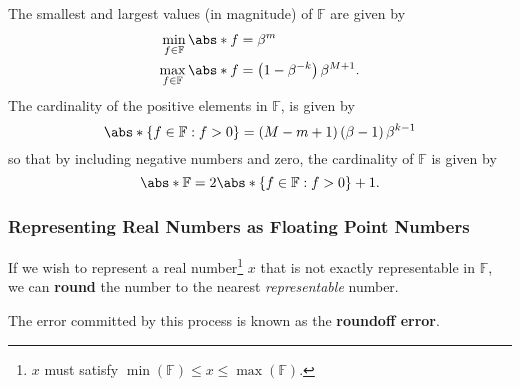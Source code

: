 \documentclass{article}
\begin{document}
\begin{corollary}
    The smallest and largest values (in magnitude) of \(\mathbb{F}\) are given by
    \begin{align*}
        \min_{f \in \mathbb{F}} \abs*{f} & = \beta^m                                      \\
        \max_{f \in \mathbb{F}} \abs*{f} & = \left( 1 - \beta^{-k} \right) \beta^{M + 1}.
    \end{align*}
    The cardinality of the positive elements in \(\mathbb{F}\),
    is given by
    \begin{equation*}
        \abs*{\left\{ f \in \mathbb{F} : f > 0 \right\}} = \left( M - m + 1 \right) \left( \beta - 1 \right) \beta^{k - 1}
    \end{equation*}
    so that by including negative numbers and zero, the cardinality of \(\mathbb{F}\)
    is given by
    \begin{equation*}
        \abs*{\mathbb{F}} = 2 \abs*{\left\{ f \in \mathbb{F} : f > 0 \right\}} + 1.
    \end{equation*}
\end{corollary}
\subsubsection{Representing Real Numbers as Floating Point Numbers}
If we wish to represent a real number\footnote{\(x\) must satisfy \(\min{\left( \mathbb{F} \right)} \leq x \leq \max{\left( \mathbb{F} \right)}\).}
\(x\) that is not exactly representable in \(\mathbb{F}\),
we can \textbf{round} the number to the nearest \textit{representable} number.

The error committed by this process is known as the \textbf{roundoff error}.
\end{document}

